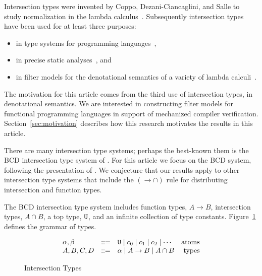 \documentclass{article}
\begin{document}
Intersection types were invented by Coppo, Dezani-Ciancaglini, and
Salle to study normalization in the lambda
calculus~\citep{Coppo:1979aa}. Subsequently intersection types have
been used for at least three purposes:
\begin{itemize}
  \item in type systems for programming
    languages~\citep{Reynolds:1988aa,Pierce:1991aa,Castagna:2014aa,Chaudhuri:2014aa,Oliveira:2016aa,Amin:2017aa,Muehlboeck:2018aa,Bi:2019aa,Dunfield:2019aa,Microsoft:TypeScript2020aa,Dotty:2020aa},
  \item in precise static
    analyses~\citep{Turbak:1997aa,Palsberg:1998aa,Mossin:2003aa,Simoes:2007aa},
    and
  \item in filter models for the denotational semantics of a variety
    of lambda
    calculi~\citep{Coppo:1980ab,Coppo:1981aa,Coppo:1984aa,Honsell:1992aa,Abramsky:1993fk,Honsell:1999aa,Ishihara:2002aa,Rocca:2004aa,Dezani-Ciancaglini:2005aa,Alessi:2006aa,Barendregt:2013aa}.
\end{itemize}
The motivation for this article comes from the third use of
intersection types, in denotational semantics.  We are interested in
constructing filter models for functional programming languages in
support of mechanized compiler
verification. Section~\ref{sec:motivation} describes how this research
motivates the results in this article.

There are many intersection type systems; perhaps the best-known them
is the BCD intersection type system of \citet{Barendregt:1983aa}. For
this article we focus on the BCD system, following the presentation of
\citet{Barendregt:2013aa}. We conjecture that our results apply to
other intersection type systems that include the $({\to}{\cap})$ rule
for distributing intersection and function types.

The BCD intersection type system includes function types, $A \to B$,
intersection types, $A \cap B$, a top type, $\mathtt{U}$, and an infinite
collection of type constants. Figure~\ref{fig:types} defines the
grammar of types.

\begin{figure}[tbp]
  \[
  \begin{array}{lclr}
    \alpha,\beta & ::= & \mathtt{U} \mid c_0 \mid c_1 \mid c_2 \mid \cdots & \text{atoms}\\
    A,B,C,D & ::= & \alpha \mid A \to B \mid A \cap B & \text{types}
  \end{array}
  \]
  \caption{Intersection Types}
  \label{fig:types}
\end{figure}
\end{document}
